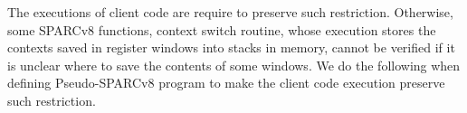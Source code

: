 The executions of client code are require to
preserve such restriction. Otherwise, some SPARCv8
functions, \eg{} context switch routine, whose
execution stores the contexts saved in
register windows into stacks in memory, cannot be
verified if it is unclear where to save the
contents of some windows.
We do the following when defining
Pseudo-SPARCv8 program to make the 
client code execution preserve such restriction.

